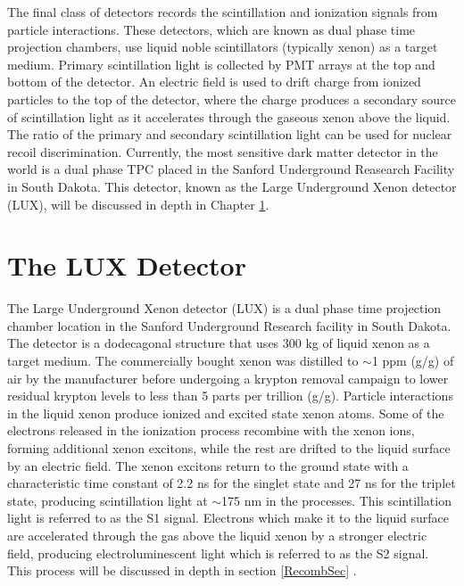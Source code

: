 \documentclass[a4paper,12pt]{article}
\begin{document}
The final class of detectors records the scintillation and ionization signals from particle interactions.  These detectors, which are known as dual phase time projection chambers, use liquid noble scintillators (typically xenon) as a target medium. Primary scintillation light is collected by PMT arrays at the top and bottom of the detector. An electric field is used to drift charge from ionized particles to the top of the detector, where the charge produces a secondary source of scintillation light as it accelerates through the gaseous xenon above the liquid.  The ratio of the primary and secondary scintillation light can be used for nuclear recoil discrimination.  Currently, the most sensitive dark matter detector in the world is a dual phase TPC placed in the Sanford Underground Reasearch Facility in South Dakota.  This detector, known as the Large Underground Xenon detector (LUX), will be discussed in depth in Chapter \ref{LUXChap}.

\newpage


\section{The LUX Detector} \label{LUXChap} %
The Large Underground Xenon detector (LUX) is a dual phase time projection chamber location in the Sanford Underground Research facility in South Dakota.  The detector is a dodecagonal structure that uses 300 kg of liquid xenon as a target medium.   The commercially bought xenon was distilled to $\sim$1 ppm (g/g) of air by the manufacturer before undergoing a krypton removal campaign to lower residual krypton levels to less than 5 parts per trillion (g/g).  Particle interactions in the liquid xenon produce ionized and excited state xenon atoms.   Some of the electrons released in the ionization process recombine with the xenon ions, forming additional xenon excitons, while the rest are drifted to the liquid surface by an electric field.   The xenon excitons return to the ground state with a characteristic time constant of 2.2 ns for the singlet state and 27 ns for the triplet state, producing scintillation light at $\sim$175 nm in the processes.  This scintillation light is referred to as the S1 signal.   Electrons which make it to the liquid surface are accelerated through the gas above the liquid xenon by a stronger electric field, producing electroluminescent light which is referred to as the S2 signal. This process will be discussed in depth in section \ref{RecombSec} .
\end{document}
